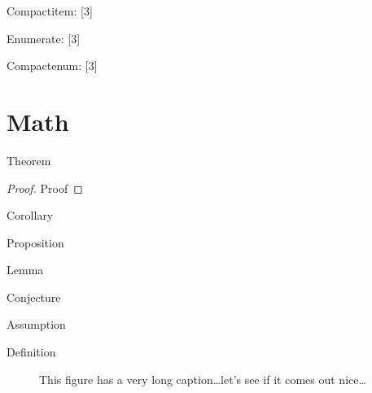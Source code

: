 \documentclass[english,counters by chapter]{uniud}
\begin{document}
\blindtext[1]
Compactitem:
[3]

\blindtext[1]
Enumerate:
[3]

\blindtext[1]
Compactenum:
[3]
\blindtext[1]

\section{Math}

\begin{theorem}
	\label{thm:first}
	Theorem
\end{theorem}
\begin{proof}
	Proof
\end{proof}

\begin{corollary}
	\label{cor:first}
	Corollary
\end{corollary}

\begin{proposition}
	\label{prop:first}
	Proposition
\end{proposition}

\begin{lemma}
	\label{lem:first}
	Lemma
\end{lemma}

\begin{conjecture}
	\label{conj:first}
	Conjecture
\end{conjecture}

\begin{assumption}
	\label{asmp:first}
	Assumption
\end{assumption}

\begin{definition}
	\label{def:first}
	Definition
\end{definition}

\begin{remark}
	\label{rem:first}
	\blindtext[1]
\end{remark}

\begin{figure}[t]
	\begin{center}
	\end{center}
	\caption{This figure has a very long caption\dots let's see if it comes out nice\dots}
	\label{fig:first}
\end{figure}
\end{document}
